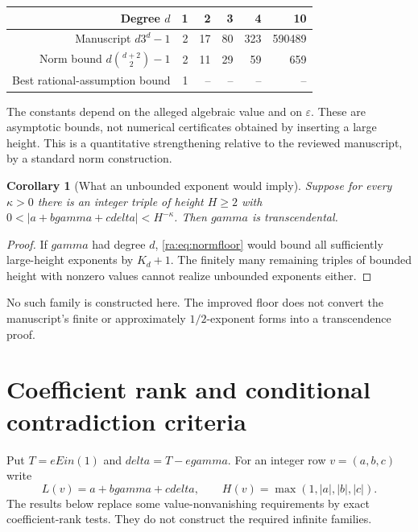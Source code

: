 \documentclass[11pt,a4paper]{article}
\DeclareMathOperator{\Ein}{Ein}
\newtheorem{corollary}[theorem]{Corollary}
\theoremstyle{definition}
\theoremstyle{remark}
\theoremstyle{plain}
\numberwithin{equation}{section}
\def\Ein{Ein}\def\gamma{gamma}\def\delta{delta}\def\eta{eta}%
\begin{document}
\begin{center}
\begin{tabular}{rrrrrr}
\toprule
Degree $d$&1&2&3&4&10\\
\midrule
Manuscript $d3^d-1$&2&17&80&323&590489\\
Norm bound $d\binom{d+2}{2}-1$&2&11&29&59&659\\
Best rational-assumption bound&1&--&--&--&--\\
\bottomrule
\end{tabular}
\end{center}
The constants depend on the alleged algebraic value and on $\varepsilon$. These are asymptotic bounds, not numerical certificates obtained by inserting a large height. This is a quantitative strengthening relative to the reviewed manuscript, by a standard norm construction.

\begin{corollary}[What an unbounded exponent would imply]
Suppose for every $\kappa>0$ there is an integer triple of height $H\ge2$ with
$0<|a+b\gamma+c\delta|<H^{-\kappa}$. Then $\gamma$ is transcendental.
\end{corollary}
\begin{proof}
If $\gamma$ had degree $d$, \eqref{ra:eq:normfloor} would bound all sufficiently large-height exponents by $K_d+1$. The finitely many remaining triples of bounded height with nonzero values cannot realize unbounded exponents either.
\end{proof}
No such family is constructed here. The improved floor does not convert the manuscript's finite or approximately $1/2$-exponent forms into a transcendence proof.

\section{Coefficient rank and conditional contradiction criteria}
\label{ra:sec:coefficient-rank}

Put $T=e\Ein(1)$ and $\delta=T-e\gamma$.  For an integer row
$v=(a,b,c)$ write
\[
 L(v)=a+b\gamma+c\delta,\qquad
 H(v)=\max(1,|a|,|b|,|c|).
\]
The results below replace some value-nonvanishing requirements by exact
coefficient-rank tests.  They do not construct the required infinite families.
\end{document}
